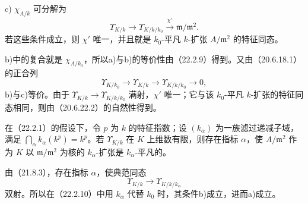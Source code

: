 \noindent c) $\chi_{A/k}$ 可分解为
\[
 \Upsilon_{K/k}\longrightarrow\Upsilon_{K/k/k_0}
 \xrightarrow{\chi'}\mathfrak m/\mathfrak m^2.
\]
若这些条件成立，则 $\chi'$ 唯一，并且就是 $k_0$-平凡 $k$-扩张 $A/\mathfrak m^2$ 的特征同态。

\eproof
b)中的复合就是 $\chi_{A/k_0}$，所以a)与b)的等价性由（22.2.9）得到。又由（20.6.18.1）的正合列
\[
 \Upsilon_{K/k_0}\longrightarrow\Upsilon_{K/k}
 \longrightarrow\Upsilon_{K/k/k_0}\longrightarrow0,
\]
b)与c)等价。由于 $\Upsilon_{K/k}\to\Upsilon_{K/k/k_0}$ 满射，$\chi'$ 唯一；它与该 $k_0$-平凡 $k$-扩张的特征同态相同，则由（20.6.22.2）的自然性得到。
\finishproof

在（22.2.1）的假设下，令 $p$ 为 $k$ 的特征指数；设 $(k_\alpha)$ 为一族滤过递减子域，满足 $\bigcap_\alpha k_\alpha(k^p)=k^p$。若 $\Upsilon_{K/k}$ 在 $K$ 上维数有限，则存在指标 $\alpha$，使 $A/\mathfrak m^2$ 作为 $K$ 以 $\mathfrak m/\mathfrak m^2$ 为核的 $k_\alpha$-扩张是 $k_\alpha$-平凡的。

\eproof
由（21.8.3），存在指标 $\alpha$，使典范同态
\[
 \Upsilon_{K/k}\longrightarrow\Upsilon_{K/k/k_\alpha}
\]
双射。所以在（22.2.10）中用 $k_\alpha$ 代替 $k_0$ 时，其条件b)成立，进而a)成立。
\finishproof
